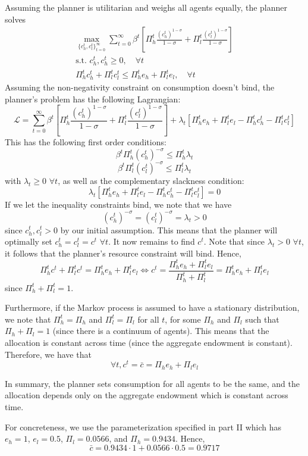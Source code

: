 \documentclass[12pt]{article}
\begin{document}
Assuming the planner is utilitarian and weighs all agents equally, the planner solves
\begin{align*}
    \max_{\{c_h^t, c_l^t\}_{t=0}^{\infty}} \sum_{t=0}^{\infty} \beta^t \left[\Pi_h^t \frac{(c_h^t)^{1-\sigma}}{1-\sigma} + \Pi_l^t \frac{(c_l^t)^{1-\sigma}}{1-\sigma} \right] \\
    \text{s.t. } c_h^t, c_h^t \geq 0, \quad \forall t\\
    \Pi_h^t c_h^t + \Pi_l^t c_l^t \leq \Pi_h^t e_h + \Pi_l^t e_l, \quad \forall t
\end{align*}
Assuming the non-negativity constraint on consumption doesn't bind, the planner's problem has the following Lagrangian:
\[\mathcal{L} = \sum_{t=0}^{\infty} \beta^t \left[\Pi_h^t \frac{(c_h^t)^{1-\sigma}}{1-\sigma} + \Pi_l^t \frac{(c_l^t)^{1-\sigma}}{1-\sigma} \right] + \lambda_t [\Pi_h^t e_h + \Pi_l^t e_l - \Pi_h^t c_h^t - \Pi_l^t c_l^t]\]
This has the following first order conditions:
\[\beta^t \Pi_h^t (c_h^t)^{-\sigma}  \leq \Pi_h^t \lambda_t \]
\[\beta^t \Pi_l^t (c_l^t)^{-\sigma} \leq \Pi_l^t \lambda_t \]
with $\lambda_t \geq 0$ $\forall t$, as well as the complementary slackness condition:
\[\lambda_t[\Pi_h^t e_h + \Pi_l^t e_l - \Pi_h^t c_h^t - \Pi_l^t c_l^t] = 0\]
If we let the inequality constraints bind, we note that we have
\[(c_h^t)^{-\sigma} =( c_l^t)^{-\sigma} = \lambda_t > 0\]
since $c_h^t, c_l^t >0$ by our initial assumption. This means that the planner will optimally set $c_h^t = c_l^t = c^t$ $\forall t$. It now remains to find $c^t$. Note that since $\lambda_t > 0$ $\forall t$, it follows that the planner's resource constraint will bind. Hence,
\[\Pi_h^t c^t + \Pi_l^t c^t = \Pi_h^t e_h + \Pi_l^t e_l \iff c^t = \frac{\Pi_h^t e_h + \Pi_l^t e_l}{\Pi_h^t + \Pi_l^t} =\Pi_h^t e_h + \Pi_l^t e_l \]
since $\Pi_h^t + \Pi_l^t = 1$.  

Furthermore, if the Markov process is assumed to have a stationary distribution, we note that $\Pi_h^t = \Pi_h$ and $\Pi_l^t = \Pi_l$ for all $t$, for some $\Pi_h$ and $\Pi_l$ such that $\Pi_h + \Pi_l = 1$ (since there is a continuum of agents). This means that the allocation is constant across time (since the aggregate endowment is constant). Therefore, we have that 
\[\forall t, c^t = \bar{c} = \Pi_h e_h + \Pi_l e_l\]

In summary, the planner sets consumption for all agents to be the same, and the allocation depends only on the aggregate endowment which is constant across time. 

For concreteness, we use the parameterization specified in part II which has $e_h = 1$, $e_l = 0.5$, $\Pi_l = 0.0566$, and $\Pi_h = 0.9434$. Hence,
\[\bar{c} = 0.9434 \cdot 1 + 0.0566 \cdot 0.5 = 0.9717\]
\end{document}

